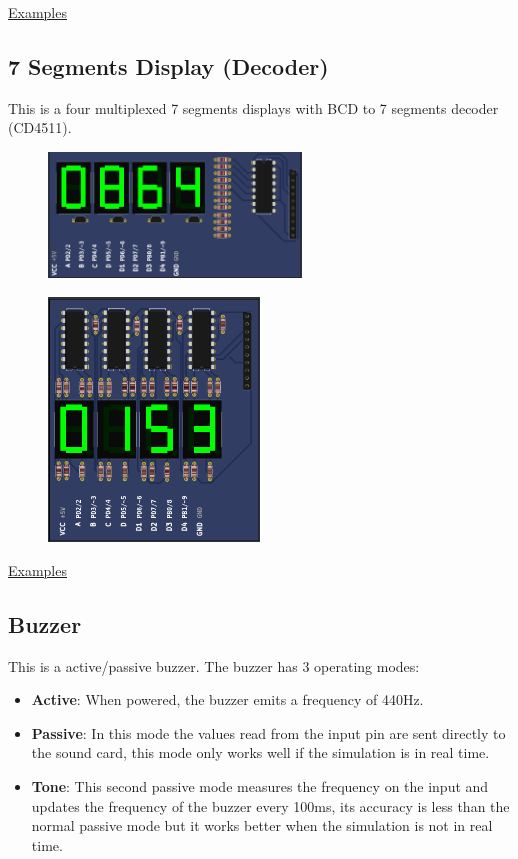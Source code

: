 \href{https://lcgamboa.github.io/picsimlab_examples/Parts.html\#7_Segments_Display}{Examples}

\subsection{7 Segments Display (Decoder)}

This is a four multiplexed 7 segments displays with BCD to 7 segments decoder (CD4511).

\begin{figure}[H]
\center
\includegraphics[width=0.6\textwidth]{img/part_7seg_dec.png} 
\end{figure} 

\begin{figure}[H]
\center
\includegraphics[width=0.5\textwidth]{img/part_7seg_latch.png} 
\end{figure} 

\href{https://lcgamboa.github.io/picsimlab_examples/Parts.html\#7_Segments_Display_(Decoder)}{Examples}

\subsection{Buzzer}

This is a active/passive buzzer.
The buzzer has 3 operating modes: 
\begin{itemize}
\item \textbf{Active}: When powered, the buzzer emits a frequency of 440Hz. 
\item \textbf{Passive}: In this mode the values read from the input pin are sent directly to the sound card, this mode only works well if the simulation is in real time. 
\item \textbf{Tone}: This second passive mode measures the frequency on the input and updates the frequency of the buzzer every 100ms, its accuracy is less than the normal passive mode but it works better when the simulation is not in real time. 
\end{itemize}

